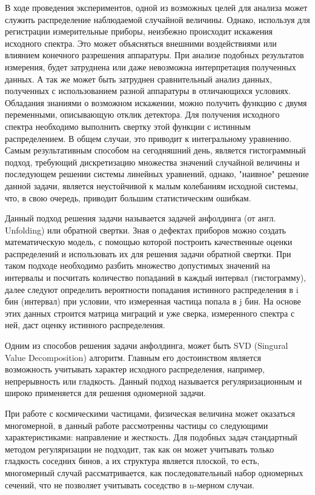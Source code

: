 \documentclass[a4paper,12pt]{diplom}
\begin{document}
\tableofcontents[Содержание]



В ходе проведения экспериментов, одной из возможных целей для анализа может служить распределение наблюдаемой случайной величины. Однако, 
используя для регистрации измерительные приборы, неизбежно происходит искажения исходного спектра. Это может объясняться внешними воздействиями 
или влиянием конечного разрешения аппаратуры. При анализе подобных результатов измерения, будет затруднена или даже невозможна интерпретация 
полученных данных. А так же может быть затруднен сравнительный анализ данных, полученных с использованием разной аппаратуры в отличающихся 
условиях. Обладания знаниями о возможном искажении, можно получить функцию с двумя переменными, описывающую отклик детектора. Для получения 
исходного спектра необходимо выполнить свертку этой функции с истинным распределением. В общем случаи, это приводит к интегральному уравнению.
Самым результативным способом на сегодняшний день, является гистограммный подход, требующий дискретизацию множества значений случайной величины 
и последующем решении системы линейных уравнений, однако, "наивное" решение данной задачи, является неустойчивой к малым колебаниям исходной 
системы, что, в свою очередь, приводит большим статистическим ошибкам.

Данный подход решения задачи называется задачей анфолдинга (от англ. Unfolding) или обратной свертки. Зная о дефектах 
приборов можно создать математическую модель, с помощью которой построить качественные оценки распределений и использовать их для решения 
задачи обратной свертки. При таком подходе необходимо разбить множество допустимых значений на интервалы и посчитать количество попаданий 
в каждый интервал (гистограмму), далее следуют определить вероятности попадания истинного распределения в i бин (интервал) 
при условии, что измеренная частица попала в j бин. На основе этих данных строится матрица миграций и уже сверка, измеренного спектра с ней, 
даст оценку истинного распределения.

Одним из способов решения задачи анфолдинга, может быть SVD (Singural Value Decomposition) алгоритм. Главным его достоинством является
возможность учитывать характер исходного распределения, например, непрерывность или гладкость. Данный подход называется регуляризационным
и широко применяется для решения одномерной задачи.

При работе с космическими частицами, физическая величина может оказаться многомерной, в данный работе рассмотренны частицы со следующими
характеристиками: направление и жесткость. Для подобных задач стандартный методом регуляризации не подходит, так как он может учитывать
только гладкость соседних бинов, а их структура является плоской, то есть, многомерный случай рассматривается, как последовательный набор
одномерных сечений, что не позволяет учитывать соседство в n-мерном случаи.
\end{document}
